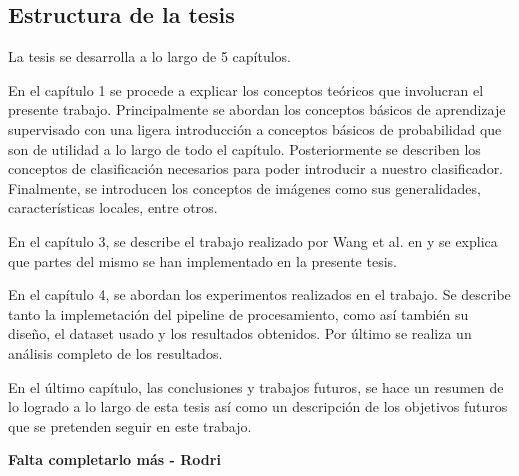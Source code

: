 \subsection{Estructura de la tesis}

	La tesis se desarrolla a lo largo de 5 capítulos.	
		
	En el capítulo 1 se procede a explicar los conceptos teóricos que involucran el presente trabajo. Principalmente se abordan los conceptos básicos de aprendizaje supervisado con una ligera introducción a conceptos básicos de probabilidad que son de utilidad a lo largo de todo el capítulo. Posteriormente se describen los conceptos de clasificación necesarios para poder introducir a nuestro clasificador. Finalmente, se introducen los conceptos de imágenes como sus generalidades, características locales, entre otros.
	
	 En el capítulo 3, se describe el trabajo realizado por Wang et al. en \cite{wang} y se explica que partes del mismo se han implementado en la presente tesis.

	En el capítulo 4, se abordan los experimentos realizados en el trabajo. Se describe tanto la implemetación del pipeline de procesamiento, como así también su diseño, el dataset usado y los resultados obtenidos. Por último se realiza un análisis completo de los resultados.
	
	En el último capítulo, las conclusiones y trabajos futuros, se hace un resumen de lo logrado a lo largo de esta tesis así como un descripción de los objetivos futuros que se pretenden seguir en este trabajo.
	
	\textbf{Falta completarlo más - Rodri}